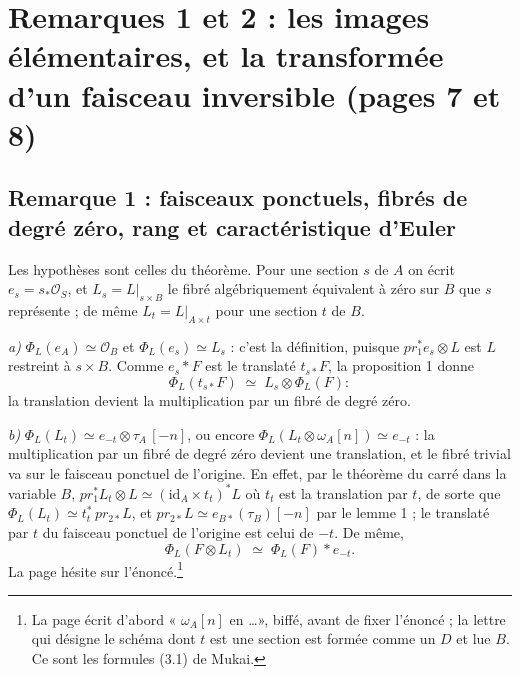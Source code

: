 \documentclass[11pt,a4paper]{article}
\begin{document}
\section*{Remarques 1 et 2 : les images élémentaires, et la transformée d'un faisceau inversible (pages 7 et 8)}

\subsection*{Remarque 1 : faisceaux ponctuels, fibrés de degré zéro, rang et caractéristique d'Euler}

Les hypothèses sont celles du théorème. Pour une section $s$ de $A$ on écrit
$e_s = s_{*}\mathcal{O}_S$, et $L_s = L|_{s \times B}$ le fibré
algébriquement équivalent à zéro sur $B$ que $s$ représente ; de même
$L_t = L|_{A \times t}$ pour une section $t$ de $B$.

\emph{a)} $\Phi_L(e_A) \simeq \mathcal{O}_B$ et $\Phi_L(e_s) \simeq L_s$ :
c'est la définition, puisque $pr_1^{*}e_s \otimes L$ est $L$ restreint à
$s \times B$. Comme $e_s * F$ est le translaté $t_{s*}F$, la proposition 1
donne
\[
  \Phi_L(t_{s*}F) \;\simeq\; L_s \otimes \Phi_L(F) :
\]
la translation devient la multiplication par un fibré de degré zéro.

\emph{b)} $\Phi_L(L_t) \simeq e_{-t} \otimes \tau_A\,[-n]$, ou encore
$\Phi_L(L_t \otimes \omega_A[n]) \simeq e_{-t}$ : la multiplication par un
fibré de degré zéro devient une translation, et le fibré trivial va sur le
faisceau ponctuel de l'origine. En effet, par le théorème du carré dans la
variable $B$, $pr_1^{*}L_t \otimes L \simeq (\mathrm{id}_A \times t_t)^{*}L$
où $t_t$ est la translation par $t$, de sorte que $\Phi_L(L_t) \simeq
t_t^{*}\,pr_{2*}L$, et $pr_{2*}L \simeq e_{B*}(\tau_B)[-n]$ par le lemme 1 ;
le translaté par $t$ du faisceau ponctuel de l'origine est celui de $-t$. De
même,
\[
  \Phi_L(F \otimes L_t) \;\simeq\; \Phi_L(F) * e_{-t}.
\]
La page hésite sur l'énoncé.\footnote{La page écrit d'abord « $\omega_A[n]$ en \ldots », biffé, avant de
fixer l'énoncé ; la lettre qui désigne le schéma dont $t$ est une section est
formée comme un $D$ et lue $B$. Ce sont les formules (3.1) de Mukai.}
\end{document}
